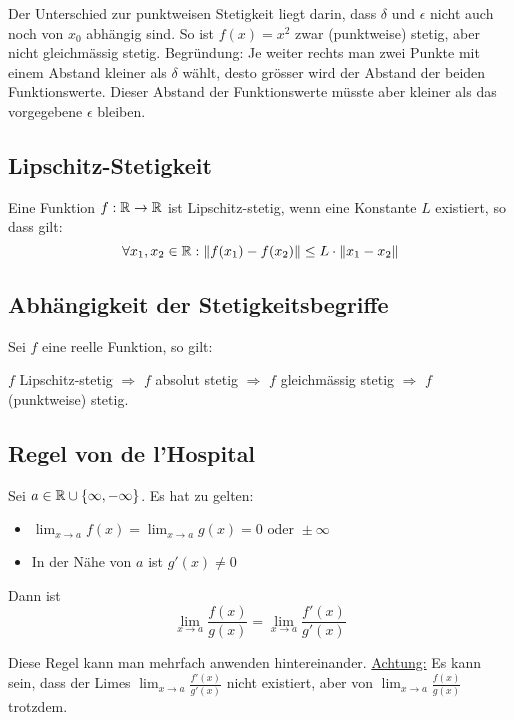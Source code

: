 Der Unterschied zur punktweisen Stetigkeit liegt darin, dass $\delta$ und
$\epsilon$ nicht auch noch von $x_0$ abhängig sind. So ist $f(x) = x^2$ zwar
(punktweise) stetig, aber nicht gleichmässig stetig. Begründung: Je weiter
rechts man zwei Punkte mit einem Abstand kleiner als $\delta$ wählt, desto
grösser wird der Abstand der beiden Funktionswerte. Dieser Abstand der
Funktionswerte müsste aber kleiner als das vorgegebene $\epsilon$ bleiben.

\subsection{Lipschitz-Stetigkeit}
Eine Funktion $f: \mathbb{R} \to \mathbb{R}$ ist Lipschitz-stetig, wenn eine Konstante $L$
existiert, so dass gilt:
\[
\forall x_1,x_2 \in \mathbb{R}: \|f(x_1) - f(x_2)\| \leq L \cdot \|x_1 - x_2\|
\]

\subsection{Abhängigkeit der Stetigkeitsbegriffe}
Sei $f$ eine reelle Funktion, so gilt:

$f$ Lipschitz-stetig $\Rightarrow$ $f$ absolut stetig $\Rightarrow$ $f$
gleichmässig stetig $\Rightarrow$ $f$ (punktweise) stetig.

\subsection{Regel von de l'Hospital}
Sei $a \in \mathbb{R} \cup \{\infty, -\infty\}$. Es hat zu gelten:
\begin{itemize}
  \item $\lim_{x \to a} f(x) = \lim_{x \to a} g(x) = 0 \text{ oder } \pm\infty$
  \item In der Nähe von $a$ ist $g'(x) \neq 0$
\end{itemize}

Dann ist
\[
\lim_{x \to a} \frac{f(x)}{g(x)} = \lim_{x \to a}
\frac{f'(x)}{g'(x)}
\]

Diese Regel kann man mehrfach anwenden hintereinander. \underline{Achtung:} Es
kann sein, dass der Limes $\lim_{x \to a} \frac{f'(x)}{g'(x)}$ nicht existiert,
aber von $\lim_{x \to a} \frac{f(x)}{g(x)}$ trotzdem.

